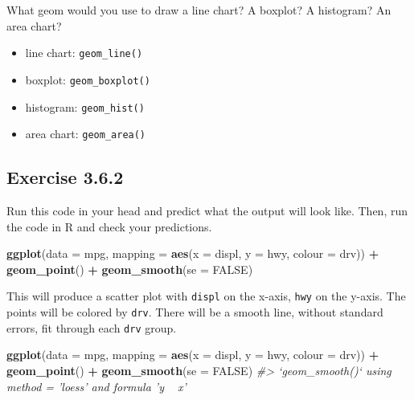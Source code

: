 \documentclass[]{book}
\newenvironment{Shaded}{\begin{snugshade}}{\end{snugshade}}
\newcommand{\CommentTok}[1]{\textcolor[rgb]{0.56,0.35,0.01}{\textit{#1}}}
\newcommand{\DataTypeTok}[1]{\textcolor[rgb]{0.13,0.29,0.53}{#1}}
\newcommand{\KeywordTok}[1]{\textcolor[rgb]{0.13,0.29,0.53}{\textbf{#1}}}
\newcommand{\NormalTok}[1]{#1}
\newcommand{\OperatorTok}[1]{\textcolor[rgb]{0.81,0.36,0.00}{\textbf{#1}}}
\newcommand{\OtherTok}[1]{\textcolor[rgb]{0.56,0.35,0.01}{#1}}
\newcommand{\StringTok}[1]{\textcolor[rgb]{0.31,0.60,0.02}{#1}}
\providecommand{\tightlist}{%
  \setlength{\itemsep}{0pt}\setlength{\parskip}{0pt}}
\theoremstyle{plain}
\theoremstyle{remark}
\begin{document}
What geom would you use to draw a line chart? A boxplot? A histogram? An
area chart?

\begin{itemize}
\tightlist
\item
  line chart: \texttt{geom\_line()}
\item
  boxplot: \texttt{geom\_boxplot()}
\item
  histogram: \texttt{geom\_hist()}
\item
  area chart: \texttt{geom\_area()}
\end{itemize}

\hypertarget{exercise-3.6.2}{%
\subsection*{\texorpdfstring{Exercise
{3.6.2}}{Exercise 3.6.2}}\label{exercise-3.6.2}}

Run this code in your head and predict what the output will look like.
Then, run the code in R and check your predictions.

\begin{Shaded}
\begin{Highlighting}[]
\KeywordTok{ggplot}\NormalTok{(}\DataTypeTok{data =}\NormalTok{ mpg, }\DataTypeTok{mapping =} \KeywordTok{aes}\NormalTok{(}\DataTypeTok{x =}\NormalTok{ displ, }\DataTypeTok{y =}\NormalTok{ hwy, }\DataTypeTok{colour =}\NormalTok{ drv)) }\OperatorTok{+}
\StringTok{  }\KeywordTok{geom_point}\NormalTok{() }\OperatorTok{+}
\StringTok{  }\KeywordTok{geom_smooth}\NormalTok{(}\DataTypeTok{se =} \OtherTok{FALSE}\NormalTok{)}
\end{Highlighting}
\end{Shaded}

This will produce a scatter plot with \texttt{displ} on the x-axis,
\texttt{hwy} on the y-axis. The points will be colored by \texttt{drv}.
There will be a smooth line, without standard errors, fit through each
\texttt{drv} group.

\begin{Shaded}
\begin{Highlighting}[]
\KeywordTok{ggplot}\NormalTok{(}\DataTypeTok{data =}\NormalTok{ mpg, }\DataTypeTok{mapping =} \KeywordTok{aes}\NormalTok{(}\DataTypeTok{x =}\NormalTok{ displ, }\DataTypeTok{y =}\NormalTok{ hwy, }\DataTypeTok{colour =}\NormalTok{ drv)) }\OperatorTok{+}
\StringTok{  }\KeywordTok{geom_point}\NormalTok{() }\OperatorTok{+}
\StringTok{  }\KeywordTok{geom_smooth}\NormalTok{(}\DataTypeTok{se =} \OtherTok{FALSE}\NormalTok{)}
\CommentTok{#> `geom_smooth()` using method = 'loess' and formula 'y ~ x'}
\end{Highlighting}
\end{Shaded}
\end{document}

